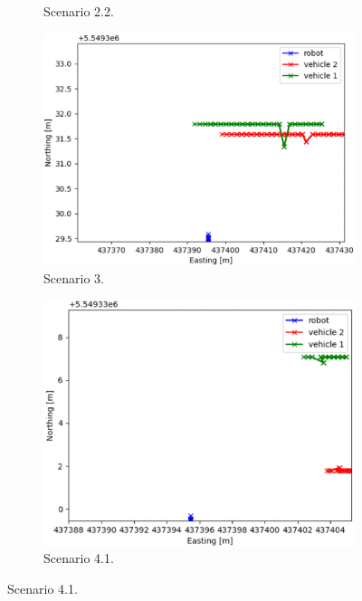 \begin{figure}[H]
\begin{subfigure}{0.32\linewidth}
                \caption{Scenario 2.2.}
            \end{subfigure}
            \begin{subfigure}{0.32\linewidth}
                \centering
                \includegraphics[width=\linewidth]{images/simulations/start_3.png}
                \caption{Scenario 3.}
            \end{subfigure}
            \begin{subfigure}{0.32\linewidth}
                \centering
                \includegraphics[width=\linewidth]{images/simulations/start_4_1.png}
                \caption{Scenario 4.1.}
            \end{subfigure}

\end{figure}
